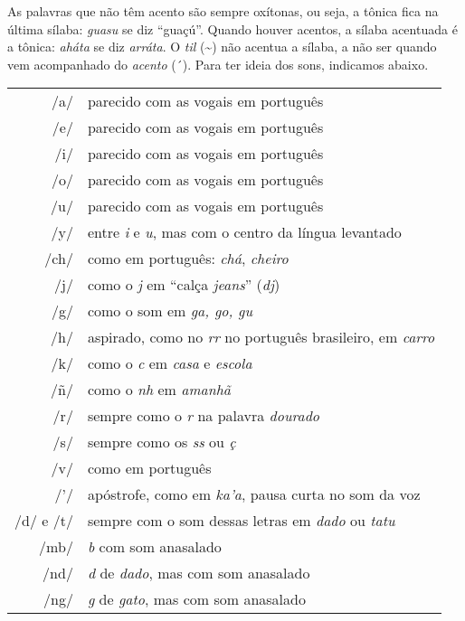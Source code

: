 As palavras que não têm acento são sempre oxítonas, ou seja, a tônica
fica na última sílaba: \textit{guasu} se diz ``guaçú''. Quando houver
acentos, a sílaba acentuada é a tônica: \textit{aháta} se diz
\textit{arráta}. O \textit{til} (\textasciitilde{}) não acentua a sílaba, a não ser
quando vem acompanhado do \textit{acento} (´). Para ter ideia dos sons, indicamos abaixo.

\bigskip

\begingroup
\begin{tabular}{rl}
/a/ & parecido com as vogais em português\\
/e/ & parecido com as vogais em português\\
/i/ & parecido com as vogais em português\\
/o/ & parecido com as vogais em português\\
/u/ & parecido com as vogais em português\\
/y/ & entre \textit{i} e \textit{u}, mas com o centro da língua levantado\\
/ch/ & como em português: \textit{chá}, \textit{cheiro}\\
/j/ & como o \textit{j} em ``calça \textit{jeans}'' (\textit{dj})\\
/g/ & como o som em \textit{ga, go, gu }\\
/h/ & aspirado, como no \textit{rr} no português brasileiro, em \textit{carro}\\
/k/ & como o \textit{c} em \textit{casa} e \textit{escola}\\
/ñ/ & como o \textit{nh} em \textit{amanhã}\\
/r/ & sempre como o \textit{r} na palavra \textit{dourado}\\
/s/ & sempre como os \textit{ss} ou \textit{ç}\\
/v/ & como em português\\
/'/ & apóstrofe, como em \textit{ka'a}, pausa curta no som da voz\\
/d/ e /t/ & sempre com o som dessas letras em \textit{dado} ou \textit{tatu}\\
/mb/ & \textit{b} com som anasalado\\
/nd/ & \textit{d} de \textit{dado}, mas com som anasalado\\
/ng/ & \textit{g} de \textit{gato}, mas com som anasalado
\end{tabular}
\endgroup





